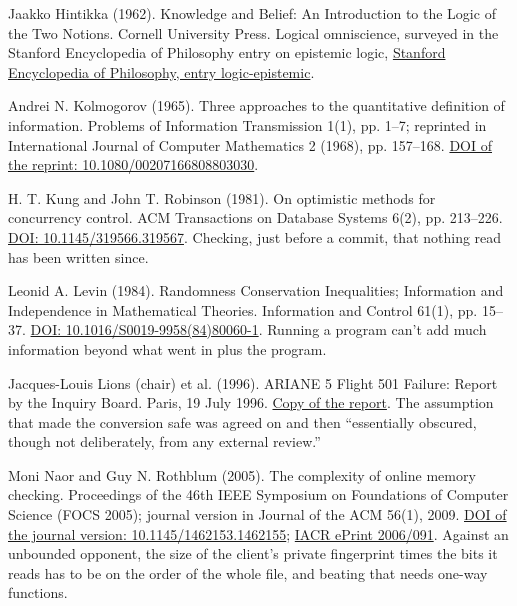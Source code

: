 \documentclass[11pt,twoside]{article}
\theoremstyle{thielethm}
\theoremstyle{thieledef}
\theoremstyle{thieledef}
\theoremstyle{thieledef}
\theoremstyle{thielethm}
\theoremstyle{thieleobs}
\theoremstyle{thielethm}
\begin{document}
\noindent Jaakko Hintikka (1962). Knowledge and Belief: An Introduction to the Logic of the Two Notions. Cornell University Press. Logical omniscience, surveyed in the Stanford Encyclopedia of Philosophy entry on epistemic logic, \href{https://plato.stanford.edu/entries/logic-epistemic/}{Stanford Encyclopedia of Philosophy, entry logic-epistemic}.
\par\medskip

\noindent Andrei N. Kolmogorov (1965). Three approaches to the quantitative definition of information. Problems of Information Transmission 1(1), pp. 1--7; reprinted in International Journal of Computer Mathematics 2 (1968), pp. 157--168. \href{https://doi.org/10.1080/00207166808803030}{DOI of the reprint: 10.1080/00207166808803030}.
\par\medskip

\noindent H. T. Kung and John T. Robinson (1981). On optimistic methods for concurrency control. ACM Transactions on Database Systems 6(2), pp. 213--226. \href{https://doi.org/10.1145/319566.319567}{DOI: 10.1145/319566.319567}. Checking, just before a commit, that nothing read has been written since.
\par\medskip

\noindent Leonid A. Levin (1984). Randomness Conservation Inequalities; Information and Independence in Mathematical Theories. Information and Control 61(1), pp. 15--37. \href{https://doi.org/10.1016/S0019-9958(84)80060-1}{DOI: 10.1016/S0019-9958(84)80060-1}. Running a program can't add much information beyond what went in plus the program.
\par\medskip

\noindent Jacques-Louis Lions (chair) et al. (1996). ARIANE 5 Flight 501 Failure: Report by the Inquiry Board. Paris, 19 July 1996. \href{https://www-users.cse.umn.edu/~arnold/disasters/ariane5rep.html}{Copy of the report}. The assumption that made the conversion safe was agreed on and then ``essentially obscured, though not deliberately, from any external review.''
\par\medskip

\noindent Moni Naor and Guy N. Rothblum (2005). The complexity of online memory checking. Proceedings of the 46th IEEE Symposium on Foundations of Computer Science (FOCS 2005); journal version in Journal of the ACM 56(1), 2009. \href{https://doi.org/10.1145/1462153.1462155}{DOI of the journal version: 10.1145/1462153.1462155}; \href{https://eprint.iacr.org/2006/091}{IACR ePrint 2006/091}. Against an unbounded opponent, the size of the client's private fingerprint times the bits it reads has to be on the order of the whole file, and beating that needs one-way functions.
\par\medskip
\end{document}
